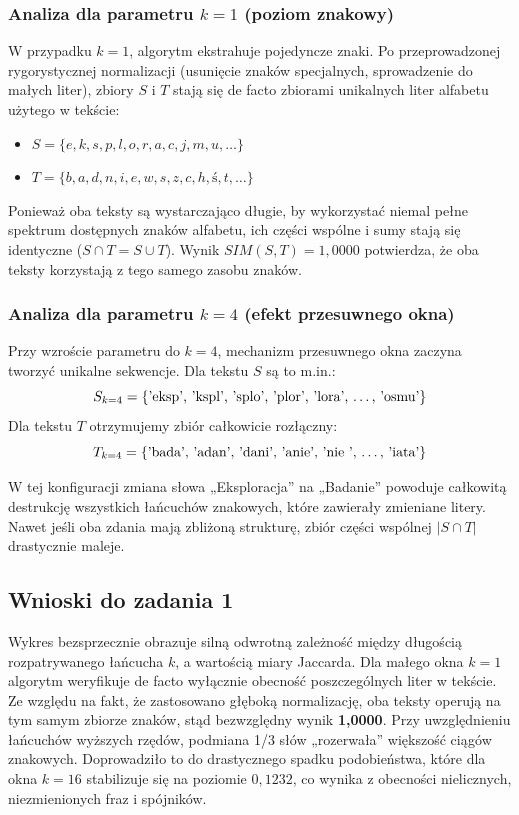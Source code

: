 \documentclass[12pt,a4paper]{article}
\begin{document}
\subsubsection{Analiza dla parametru $k=1$ (poziom znakowy)}
W przypadku $k=1$, algorytm ekstrahuje pojedyncze znaki. Po przeprowadzonej rygorystycznej normalizacji (usunięcie znaków specjalnych, sprowadzenie do małych liter), zbiory $S$ i $T$ stają się de facto zbiorami unikalnych liter alfabetu użytego w tekście:
\begin{itemize}
    \item $S = \{e, k, s, p, l, o, r, a, c, j, m, u, \dots\}$
    \item $T = \{b, a, d, n, i, e, w, s, z, c, h, ś, t, \dots\}$
\end{itemize}
Ponieważ oba teksty są wystarczająco długie, by wykorzystać niemal pełne spektrum dostępnych znaków alfabetu, ich części wspólne i sumy stają się identyczne ($S \cap T = S \cup T$). Wynik $SIM(S, T) = 1,0000$ potwierdza, że oba teksty korzystają z tego samego zasobu znaków.

\subsubsection{Analiza dla parametru $k=4$ (efekt przesuwnego okna)}
Przy wzroście parametru do $k=4$, mechanizm przesuwnego okna zaczyna tworzyć unikalne sekwencje. Dla tekstu $S$ są to m.in.:
\begin{displaymath}
S_{k=4} = \{ \text{'eksp', 'kspl', 'splo', 'plor', 'lora', \dots, 'osmu'} \}
\end{displaymath}
Dla tekstu $T$ otrzymujemy zbiór całkowicie rozłączny:
\begin{displaymath}
T_{k=4} = \{ \text{'bada', 'adan', 'dani', 'anie', 'nie ', \dots, 'iata'} \}
\end{displaymath}

W tej konfiguracji zmiana słowa „Eksploracja” na „Badanie” powoduje całkowitą destrukcję wszystkich łańcuchów znakowych, które zawierały zmieniane litery. Nawet jeśli oba zdania mają zbliżoną strukturę, zbiór części wspólnej $|S \cap T|$ drastycznie maleje.

\subsection{Wnioski do zadania 1}
Wykres bezsprzecznie obrazuje silną odwrotną zależność między długością rozpatrywanego łańcucha $k$, a wartością miary Jaccarda. 
Dla małego okna $k=1$ algorytm weryfikuje de facto wyłącznie obecność poszczególnych liter w tekście. Ze względu na fakt, że zastosowano głęboką normalizację, oba teksty operują na tym samym zbiorze znaków, stąd bezwzględny wynik \textbf{1,0000}.
Przy uwzględnieniu łańcuchów wyższych rzędów, podmiana 1/3 słów „rozerwała” większość ciągów znakowych. Doprowadziło to do drastycznego spadku podobieństwa, które dla okna $k=16$ stabilizuje się na poziomie $0,1232$, co wynika z obecności nielicznych, niezmienionych fraz i spójników.
\end{document}
